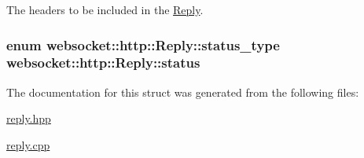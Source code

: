 The headers to be included in the \hyperlink{structwebsocket_1_1http_1_1Reply}{Reply}. 

\subsubsection[{\texorpdfstring{status}{status}}]{\setlength{\rightskip}{0pt plus 5cm}enum {\bf websocket\+::http\+::\+Reply\+::status\+\_\+type}  websocket\+::http\+::\+Reply\+::status}\hypertarget{structwebsocket_1_1http_1_1Reply_afa1b8fc57be88cfc33b7788d37ae42b8}{}\label{structwebsocket_1_1http_1_1Reply_afa1b8fc57be88cfc33b7788d37ae42b8}


The documentation for this struct was generated from the following files\+:\begin{DoxyCompactItemize}
\item 
\hyperlink{reply_8hpp}{reply.\+hpp}\item 
\hyperlink{reply_8cpp}{reply.\+cpp}\end{DoxyCompactItemize}
